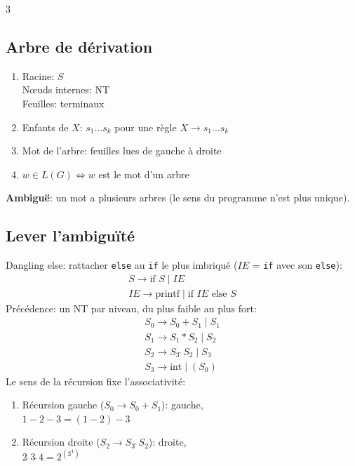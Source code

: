 \documentclass[12pt, a4paper]{article}
\begin{document}
\begin{multicols*}{3}
	\subsection{Arbre de dérivation}
	\begin{enumerate}[\roman*.]
		\item Racine: $S$\\Nœuds internes: NT\\Feuilles: terminaux
		\item Enfants de $X$: $s_1\ldots s_k$ pour une règle $X\rightarrow s_1\ldots s_k$
		\item Mot de l'arbre: feuilles lues de gauche à droite
		\item $w\in L(G)\iff w$ est le mot d'un arbre
	\end{enumerate}
	\textbf{Ambiguë}: un mot a plusieurs arbres (le sens du programme n'est plus unique).
 
	\subsection{Lever l'ambiguïté}
	Dangling else: rattacher \lstinline|else| au \lstinline|if| le plus imbriqué ($IE$ = \lstinline|if| avec son \lstinline|else|):
	\begin{gather*}
		S \rightarrow \text{if } S \mid IE\\
		IE \rightarrow \text{printf} \mid \text{if } IE \text{ else } S
	\end{gather*}
	Précédence: un NT par niveau, du plus faible au plus fort:
	\begin{gather*}
		S_0 \rightarrow S_0 + S_1 \mid S_1\\
		S_1 \rightarrow S_1 * S_2 \mid S_2\\
		S_2 \rightarrow S_3\,\hat{}\,S_2 \mid S_3\\
		S_3 \rightarrow \text{int} \mid (S_0)
	\end{gather*}
	Le sens de la récursion fixe l'associativité:
	\begin{enumerate}[\roman*.]
		\item Récursion gauche ($S_0\rightarrow S_0+S_1$): gauche,\\$1-2-3=(1-2)-3$
		\item Récursion droite ($S_2\rightarrow S_3\,\hat{}\,S_2$): droite,\\$2\,\hat{}\,3\,\hat{}\,4=2^{(3^4)}$
	\end{enumerate}
 

\end{multicols*}
\end{document}
